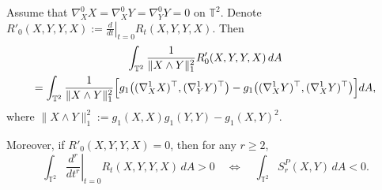 \documentclass[graybox]{svmult}
\begin{document}
\begin{theorem}\label{thm:rvariation}
Assume that $\nabla^0_X X = \nabla^0_X Y = \nabla^0_Y Y = 0$ on $\mathbb{T}^2$. Denote $R'_0(X,Y,Y,X) := \left.\frac{d}{dt}\right|_{t=0} R_t(X,Y,Y,X)$. Then
\begin{multline}\label{eq:first-variation}
\int_{\mathbb{T}^2} \frac{1}{\|X\wedge Y\|_1^2} R'_0(X,Y,Y,X) \, dA \\
= \int_{\mathbb{T}^2} \frac{1}{\|X\wedge Y\|_1^2} \Bigl[
g_1\bigl((\nabla^1_X X)^\top, (\nabla^1_Y Y)^\top\bigr) 
- g_1\bigl((\nabla^1_X Y)^\top, (\nabla^1_X Y)^\top\bigr) \Bigr] dA,
\end{multline}
where $\|X\wedge Y\|_1^2 := g_1(X,X)g_1(Y,Y) - g_1(X,Y)^2$.

Moreover, if $R'_0(X,Y,Y,X) = 0$, then for any $r \geq 2$,
\begin{equation}\label{eq:higher-order-condition}
\int_{\mathbb{T}^2} \left.\frac{d^r}{dt^r}\right|_{t=0} R_t(X,Y,Y,X) \, dA > 0 
\quad\Longleftrightarrow\quad 
\int_{\mathbb{T}^2} S_r^P(X,Y) \, dA < 0.
\end{equation}
\end{theorem}
\end{document}
